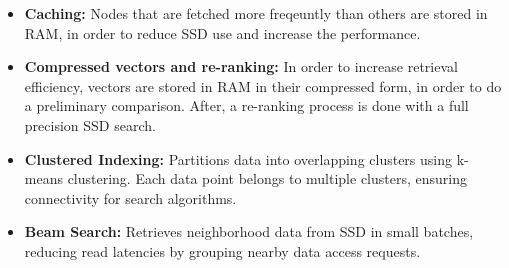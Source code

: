 \begin{itemize}
    \item \textbf{Caching:} Nodes that are fetched more freqeuntly than others are stored in RAM, in order to reduce SSD use and increase the performance.
    \item \textbf{Compressed vectors and re-ranking:} In order to increase retrieval efficiency, vectors are stored in RAM in their compressed form, in order to do a preliminary comparison. After, a re-ranking process is done with a full precision SSD search.
    \item \textbf{Clustered Indexing:} Partitions data into overlapping clusters using k-means clustering. Each data point belongs to multiple clusters, ensuring connectivity for search algorithms.
    \item \textbf{Beam Search:} Retrieves neighborhood data from SSD in small batches, reducing read latencies by grouping nearby data access requests.
\end{itemize}